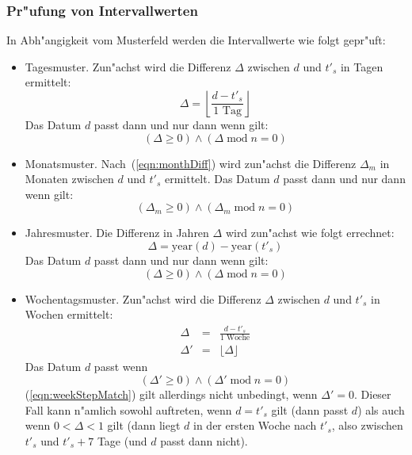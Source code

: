 \documentclass[a4paper]{article}
\newcommand*{\yearf}{\mathrm{year}}
\renewcommand{\mod}{\;\mathrm{mod}\;}
\numberwithin{equation}{section}
\begin{document}
\subsubsection{Pr"ufung von Intervallwerten}
In Abh"angigkeit vom Musterfeld werden die Intervallwerte wie folgt gepr"uft:
\begin{itemize}
\item Tagesmuster. Zun"achst wird die Differenz $\Delta$ zwischen $d$ und $t'_s$
  in Tagen ermittelt:
  \begin{equation}
    \Delta = \left\lfloor\frac{d - t'_s}{1 \textrm{ Tag}}\right\rfloor
  \end{equation}
  Das Datum $d$ passt dann und nur dann wenn gilt:
  \begin{equation}(\Delta \ge 0) \wedge (\Delta \mod n = 0)\end{equation}
\item Monatsmuster. Nach~(\ref{eqn:monthDiff}) wird zun"achst die Differenz
  $\Delta_m$ in Monaten zwischen $d$ und $t'_s$ ermittelt. Das Datum $d$ passt
  dann und nur dann wenn gilt:
  \begin{equation}(\Delta_m \ge 0) \wedge (\Delta_m \mod n = 0)\end{equation}
\item Jahresmuster. Die Differenz in Jahren $\Delta$ wird zun"achst wie folgt
  errechnet:
  \begin{equation}\Delta = \yearf(d) - \yearf(t'_s)\end{equation}
  Das Datum $d$ passt dann und nur dann wenn gilt:
  \begin{equation}(\Delta \ge 0) \wedge (\Delta \mod n = 0)\end{equation}
\item Wochentagsmuster. Zun"achst wird die Differenz $\Delta$ zwischen $d$ und
  $t'_s$ in Wochen ermittelt:
  \begin{eqnarray}
    \Delta & = & \frac{d - t'_s}{1 \textrm{ Woche}} \\
    \Delta' & = & \lfloor\Delta\rfloor
  \end{eqnarray}
  Das Datum $d$ passt wenn
  \begin{equation}\label{eqn:weekStepMatch}
    (\Delta' \ge 0) \wedge (\Delta' \mod n = 0)
  \end{equation}
  (\ref{eqn:weekStepMatch}) gilt allerdings nicht unbedingt, wenn $\Delta' = 0$.
  Dieser Fall kann n"amlich sowohl auftreten, wenn $d = t'_s$ gilt (dann passt
  $d$) als auch wenn $0 < \Delta < 1$ gilt (dann liegt $d$ in der ersten Woche
  nach $t'_s$, also zwischen $t'_s$ und $t'_s + 7$ Tage (und $d$ passt dann
  nicht).
\end{itemize}
\end{document}
